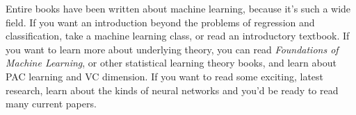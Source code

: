 \documentclass[11pt,paper=letter]{scrartcl}
\begin{document}
Entire books have been written about machine learning, because it's such a wide field. If you want an introduction beyond the problems of regression and classification, take a machine learning class, or read an introductory textbook. If you want to learn more about underlying theory, you can read \textit{Foundations of Machine Learning}, or other statistical learning theory books, and learn about PAC learning and VC dimension. If you want to read some exciting, latest research, learn about the kinds of neural networks and you'd be ready to read many current papers.
\end{document}
